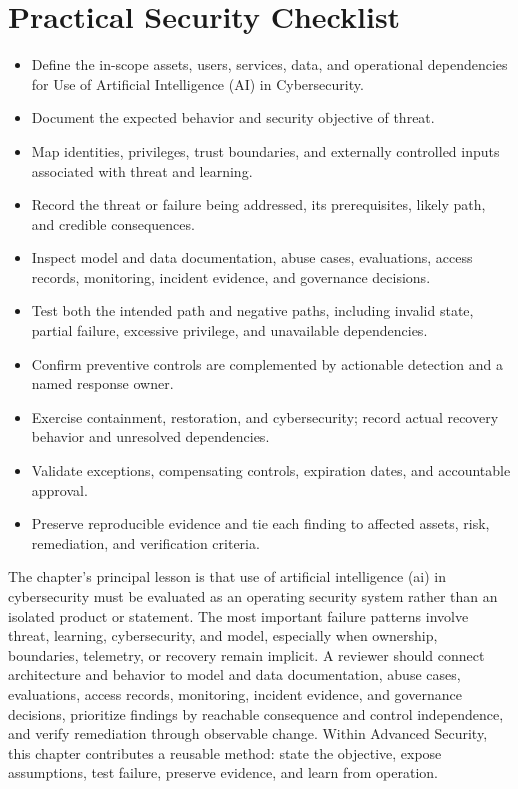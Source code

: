 \documentclass[11pt]{article}
\begin{document}
\section*{Practical Security Checklist}
\begin{itemize}[label=$\square$]
\item Define the in-scope assets, users, services, data, and operational dependencies for Use of Artificial Intelligence (AI) in Cybersecurity.
\item Document the expected behavior and security objective of threat.
\item Map identities, privileges, trust boundaries, and externally controlled inputs associated with threat and learning.
\item Record the threat or failure being addressed, its prerequisites, likely path, and credible consequences.
\item Inspect model and data documentation, abuse cases, evaluations, access records, monitoring, incident evidence, and governance decisions.
\item Test both the intended path and negative paths, including invalid state, partial failure, excessive privilege, and unavailable dependencies.
\item Confirm preventive controls are complemented by actionable detection and a named response owner.
\item Exercise containment, restoration, and cybersecurity; record actual recovery behavior and unresolved dependencies.
\item Validate exceptions, compensating controls, expiration dates, and accountable approval.
\item Preserve reproducible evidence and tie each finding to affected assets, risk, remediation, and verification criteria.
\end{itemize}
\begin{synthesisbox}
The chapter's principal lesson is that use of artificial intelligence (ai) in cybersecurity must be evaluated as an operating security system rather than an isolated product or statement. The most important failure patterns involve threat, learning, cybersecurity, and model, especially when ownership, boundaries, telemetry, or recovery remain implicit. A reviewer should connect architecture and behavior to model and data documentation, abuse cases, evaluations, access records, monitoring, incident evidence, and governance decisions, prioritize findings by reachable consequence and control independence, and verify remediation through observable change. Within Advanced Security, this chapter contributes a reusable method: state the objective, expose assumptions, test failure, preserve evidence, and learn from operation.
\end{synthesisbox}
\end{document}
